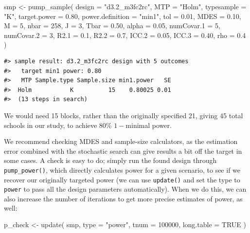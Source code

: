 \documentclass{article}
\newenvironment{Shaded}{\begin{snugshade}}{\end{snugshade}}
\newcommand{\AttributeTok}[1]{\textcolor[rgb]{0.77,0.63,0.00}{#1}}
\newcommand{\ConstantTok}[1]{\textcolor[rgb]{0.00,0.00,0.00}{#1}}
\newcommand{\DecValTok}[1]{\textcolor[rgb]{0.00,0.00,0.81}{#1}}
\newcommand{\FloatTok}[1]{\textcolor[rgb]{0.00,0.00,0.81}{#1}}
\newcommand{\FunctionTok}[1]{\textcolor[rgb]{0.00,0.00,0.00}{#1}}
\newcommand{\NormalTok}[1]{#1}
\newcommand{\OtherTok}[1]{\textcolor[rgb]{0.56,0.35,0.01}{#1}}
\newcommand{\StringTok}[1]{\textcolor[rgb]{0.31,0.60,0.02}{#1}}
\begin{document}
\begin{Shaded}
\begin{Highlighting}[]
\NormalTok{smp }\OtherTok{\textless{}{-}} \FunctionTok{pump\_sample}\NormalTok{(}
  \AttributeTok{design =} \StringTok{"d3.2\_m3fc2rc"}\NormalTok{,}
  \AttributeTok{MTP =} \StringTok{"Holm"}\NormalTok{,}
  \AttributeTok{typesample =} \StringTok{"K"}\NormalTok{,}
  \AttributeTok{target.power =} \FloatTok{0.80}\NormalTok{, }\AttributeTok{power.definition =} \StringTok{"min1"}\NormalTok{, }\AttributeTok{tol =} \FloatTok{0.01}\NormalTok{,}
  \AttributeTok{MDES =} \FloatTok{0.10}\NormalTok{, }\AttributeTok{M =} \DecValTok{5}\NormalTok{, }\AttributeTok{nbar =} \DecValTok{258}\NormalTok{, }\AttributeTok{J =} \DecValTok{3}\NormalTok{,}
  \AttributeTok{Tbar =} \FloatTok{0.50}\NormalTok{, }\AttributeTok{alpha =} \FloatTok{0.05}\NormalTok{, }\AttributeTok{numCovar.1 =} \DecValTok{5}\NormalTok{, }\AttributeTok{numCovar.2 =} \DecValTok{3}\NormalTok{,}
  \AttributeTok{R2.1 =} \FloatTok{0.1}\NormalTok{, }\AttributeTok{R2.2 =} \FloatTok{0.7}\NormalTok{, }\AttributeTok{ICC.2 =} \FloatTok{0.05}\NormalTok{, }\AttributeTok{ICC.3 =} \FloatTok{0.40}\NormalTok{, }\AttributeTok{rho =} \FloatTok{0.4}\NormalTok{ )}
\end{Highlighting}
\end{Shaded}

\begin{verbatim}
#> sample result: d3.2_m3fc2rc design with 5 outcomes
#>   target min1 power: 0.80
#>   MTP Sample.type Sample.size min1.power   SE
#>  Holm           K          15    0.80025 0.01
#>  (13 steps in search)
\end{verbatim}

We would need 15 blocks, rather than the originally specified 21, giving
45 total schools in our study, to achieve 80\% \(1-\)minimal power.

We recommend checking MDES and sample-size calculators, as the
estimation error combined with the stochastic search can give results a
bit off the target in some cases. A check is easy to do; simply run the
found design through \texttt{pump\_power()}, which directly calculates
power for a given scenario, to see if we recover our originally targeted
power (we can use \texttt{update()} and set the type to \texttt{power}
to pass all the design parameters automatically). When we do this, we
can also increase the number of iterations to get more precise estimates
of power, as well:

\begin{Shaded}
\begin{Highlighting}[]
\NormalTok{p\_check }\OtherTok{\textless{}{-}} \FunctionTok{update}\NormalTok{( smp, }\AttributeTok{type =} \StringTok{"power"}\NormalTok{, }\AttributeTok{tnum =} \DecValTok{100000}\NormalTok{,}
                   \AttributeTok{long.table =} \ConstantTok{TRUE}\NormalTok{ )}
\end{Highlighting}
\end{Shaded}
\end{document}
